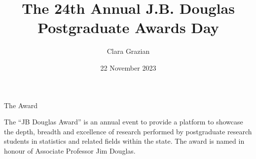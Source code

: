 \documentclass[english]{beamer}
\title[24th JB Douglas]{The 24th Annual J.B. Douglas Postgraduate Awards Day} %
\author[C. Grazian]{Clara Grazian} %
\institute [NSW SSA]%
{
THE STATISTICAL SOCIETY OF AUSTRALIA Inc. \\
New South Wales Branch \\%
\bigskip

\textit{2:00pm AEST Monday, 22nd November 2023} \\
\medskip
\textit{The Cullen Room, The University of Sydney and online (via Zoom)} \\

}
\date{22 November 2023} %
\begin{document}


\begin{frame}
\titlepage %
\end{frame}


\begin{frame}{The Award}

The ``JB Douglas Award'' is an annual event to provide a platform to showcase the depth, breadth and excellence of research performed by postgraduate research students in statistics and related fields within the state. The award is named in honour of Associate Professor Jim Douglas. 

\end{frame}

\end{document}
